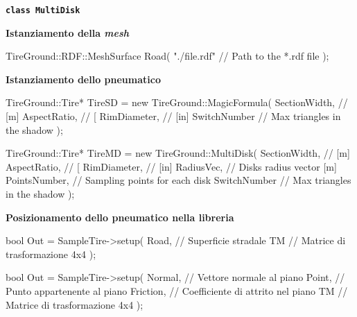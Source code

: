 \documentclass[xcolor=dvipsnames]{beamer} %
\begin{document}
\begin{frame}[fragile]
	\Large{\textbf{\texttt{class MultiDisk}}}
	\normalsize
	\\[-1cm]
	\begin{figure}[h!]
		\centering
	\end{figure}
\end{frame}

\begin{frame}[fragile]
	\Large{\textbf{Istanziamento della \textit{mesh}}}
\begin{pseudoc}
TireGround::RDF::MeshSurface Road(
    "./file.rdf" // Path to the *.rdf file
);
\end{pseudoc}
\end{frame}	

\begin{frame}[fragile]
	\Large{\textbf{Istanziamento dello pneumatico}}
	\normalsize
\begin{pseudoc}
TireGround::Tire* TireSD = new TireGround::MagicFormula(
    SectionWidth, // [m]
    AspectRatio,  // [%
    RimDiameter,  // [in]
    SwitchNumber  // Max triangles in the shadow
);
\end{pseudoc}
\begin{pseudoc}
TireGround::Tire* TireMD = new TireGround::MultiDisk(
    SectionWidth, // [m]
    AspectRatio,  // [%
    RimDiameter,  // [in]
    RadiusVec,    // Disks radius vector [m]
    PointsNumber, // Sampling points for each disk
    SwitchNumber  // Max triangles in the shadow
);
\end{pseudoc}
\end{frame}

\begin{frame}[fragile]
	\Large{\textbf{Posizionamento dello pneumatico nella libreria}}
	\normalsize
\begin{pseudoc}
bool Out = SampleTire->setup(
    Road, // Superficie stradale
    TM    // Matrice di trasformazione 4x4
);
\end{pseudoc}
\begin{pseudoc}
bool Out = SampleTire->setup(
    Normal,   // Vettore normale al piano
    Point,    // Punto appartenente al piano
    Friction, // Coefficiente di attrito nel piano
    TM        // Matrice di trasformazione 4x4
);
\end{pseudoc}
\end{frame}
\end{document}
